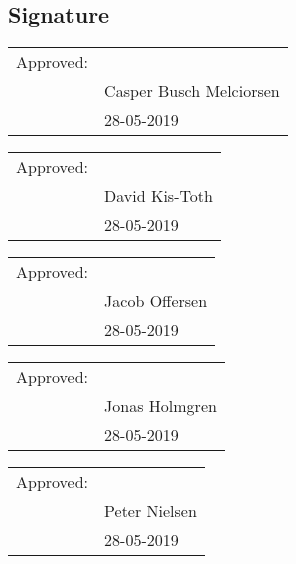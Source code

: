 \subsection*{Signature}


\begin{tabular}{@{}p{.5in}p{4in}@{}}
	Approved: & \hrulefill \\
	& Casper Busch Melciorsen \\
	& 28-05-2019 \\
\end{tabular}

\bigskip
\begin{tabular}{@{}p{.5in}p{4in}@{}}
	Approved: & \hrulefill \\
	& David Kis-Toth \\
	& 28-05-2019 \\
\end{tabular}

\bigskip
\begin{tabular}{@{}p{.5in}p{4in}@{}}
	Approved: & \hrulefill \\
	& Jacob Offersen \\
	& 28-05-2019 \\
\end{tabular}

\bigskip
\begin{tabular}{@{}p{.5in}p{4in}@{}}
	Approved: & \hrulefill \\
	& Jonas Holmgren \\
	& 28-05-2019 \\
\end{tabular}

\bigskip
\begin{tabular}{@{}p{.5in}p{4in}@{}}
	Approved: & \hrulefill \\
	& Peter Nielsen \\
	& 28-05-2019 \\
\end{tabular}